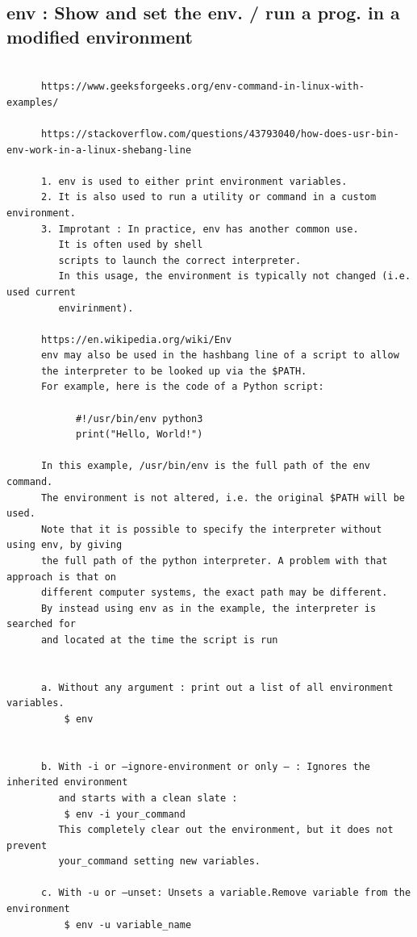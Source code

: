 \documentclass[a4paper,12pt]{article}
\begin{document}
\subsection{env   : Show and set the env. / run a prog. in a modified environment }
\begin{verbatim}

      https://www.geeksforgeeks.org/env-command-in-linux-with-examples/

      https://stackoverflow.com/questions/43793040/how-does-usr-bin-env-work-in-a-linux-shebang-line

      1. env is used to either print environment variables. 
      2. It is also used to run a utility or command in a custom environment.
      3. Improtant : In practice, env has another common use. 
         It is often used by shell 
         scripts to launch the correct interpreter. 
         In this usage, the environment is typically not changed (i.e. used current 
         envirinment).
      
      https://en.wikipedia.org/wiki/Env
      env may also be used in the hashbang line of a script to allow
      the interpreter to be looked up via the $PATH.
      For example, here is the code of a Python script:

            #!/usr/bin/env python3
            print("Hello, World!")
            
      In this example, /usr/bin/env is the full path of the env command.
      The environment is not altered, i.e. the original $PATH will be used.
      Note that it is possible to specify the interpreter without using env, by giving             
      the full path of the python interpreter. A problem with that approach is that on 
      different computer systems, the exact path may be different. 
      By instead using env as in the example, the interpreter is searched for
      and located at the time the script is run


      a. Without any argument : print out a list of all environment variables. 
          $ env
        
      
      b. With -i or –ignore-environment or only – : Ignores the inherited environment
         and starts with a clean slate :
          $ env -i your_command          
         This completely clear out the environment, but it does not prevent
         your_command setting new variables.  
      
      c. With -u or –unset: Unsets a variable.Remove variable from the environment
          $ env -u variable_name    


\end{verbatim}
\end{document}
